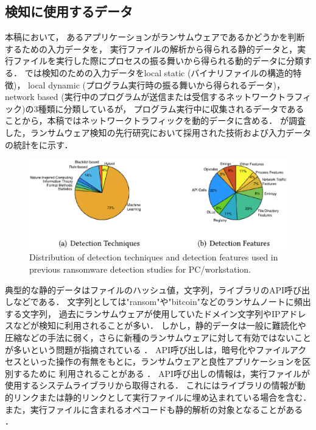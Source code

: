 \subsection{検知に使用するデータ}
本稿において，
あるアプリケーションがランサムウェアであるかどうかを判断するための入力データを，
実行ファイルの解析から得られる静的データと，実行ファイルを実行した際にプロセスの振る舞いから得られる動的データに分類する．
\cite{berrueta2019survey}では検知のための入力データをlocal static (バイナリファイルの構造的特徴)，
local dynamic (プログラム実行時の振る舞いから得られるデータ)，
network based (実行中のプログラムが送信または受信するネットワークトラフィック)の3種類に分類しているが，
プログラム実行中に収集されるデータであることから，本稿ではネットワークトラフィックを動的データに含める．
\cite{Evolution-Ransomware}が調査した，ランサムウェア検知の先行研究において採用された技術および入力データの統計をに示す．
\begin{figure}[t]
  \begin{center}
    \includegraphics[width=\columnwidth]{doc/img/detection_overview.eps}
  \end{center}
  \caption{Distribution of detection techniques and detection features used in previous ransomware detection studies for PC/workstation. \cite{Evolution-Ransomware}}
  \label{fig:detection-overview}
\end{figure}


典型的な静的データはファイルのハッシュ値，文字列，ライブラリのAPI呼び出しなどである．
文字列としては"ransom"や"bitcoin"などのランサムノートに頻出する文字列，
過去にランサムウェアが使用していたドメイン文字列やIPアドレスなどが検知に利用されることが多い\cite{berrueta2019survey}．
しかし，静的データは一般に難読化や圧縮などの手法に弱く，さらに新種のランサムウェアに対して有効ではないことが多いという問題が指摘されている \cite{mitigation-modern}．
API呼び出しは，暗号化やファイルアクセスといった操作の有無をもとに，ランサムウェアと良性アプリケーションを区別するために
利用されることがある \cite{Evolution-Ransomware}．
API呼び出しの情報は，実行ファイルが使用するシステムライブラリから取得される．
これにはライブラリの情報が動的リンクまたは静的リンクとして実行ファイルに埋め込まれている場合を含む．
また，実行ファイルに含まれるオペコードも静的解析の対象となることがある \cite{baldwin2018leveraging}．

